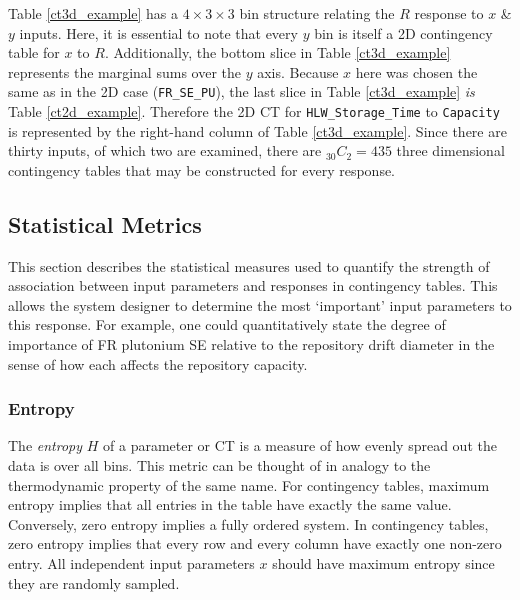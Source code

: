 

Table \ref{ct3d_example} has a $4\times 3\times 3$ bin structure relating the $R$ response 
to $x$ \& $y$ inputs.  Here, it is essential to note that every $y$ bin
is itself a 2D contingency table for $x$ to $R$.
Additionally, the bottom slice in Table \ref{ct3d_example} represents the marginal sums over 
the $y$ axis.  Because $x$ here was chosen the same as in the
2D case (\texttt{FR\_SE\_PU}), the last slice in Table \ref{ct3d_example} \emph{is} Table 
\ref{ct2d_example}.  Therefore the 2D CT for \texttt{HLW\_Storage\_Time}
to \texttt{Capacity} is represented by the right-hand column of Table \ref{ct3d_example}.
Since there are thirty inputs, of which two are examined, there are $_{30}C_2 = 435$ three 
dimensional contingency tables that may be constructed for every response.


\subsection{Statistical Metrics}
\label{cts_sec:statistical_metrics}

This section describes the statistical measures used to quantify the strength of association 
between input parameters and responses in contingency tables.
This allows the system designer to determine the most `important' input parameters to this response.  
For example, one
could quantitatively state the degree of importance of FR plutonium SE relative to the repository drift 
diameter in the sense of how each affects the repository capacity.

\subsubsection{Entropy}
\label{cts_sec:entropy}

The \emph{entropy} $H$ of a parameter or CT is a measure of how evenly spread out the data is over all 
bins.  This metric can be thought of
in analogy to the thermodynamic property of the same name.  For contingency tables,
maximum entropy implies that all entries in the table have exactly the same value.
Conversely, zero entropy implies a fully ordered system.  In contingency tables, zero entropy implies 
that every row and every column have exactly one
non-zero entry.  All independent input parameters $x$ should have maximum entropy since they are 
randomly sampled.

